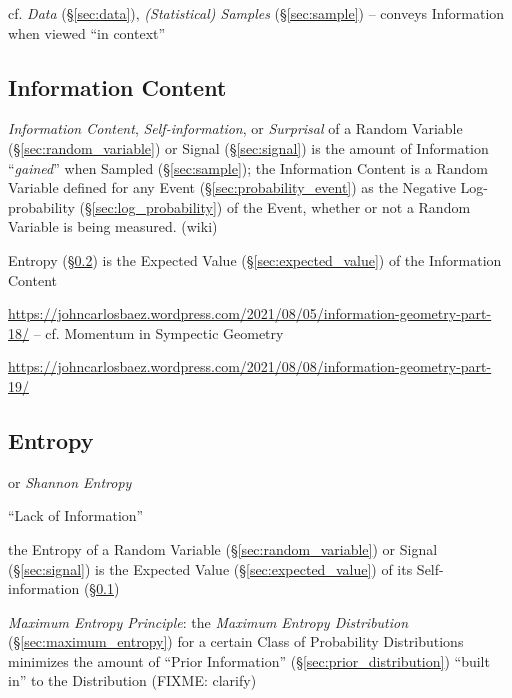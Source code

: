 \fist cf. \emph{Data} (\S\ref{sec:data}), \emph{(Statistical) Samples}
(\S\ref{sec:sample}) -- conveys Information when viewed ``in context''



\subsection{Information Content}\label{sec:information_content}

\emph{Information Content}, \emph{Self-information}, or \emph{Surprisal} of a
Random Variable (\S\ref{sec:random_variable}) or Signal (\S\ref{sec:signal}) is
the amount of Information ``\emph{gained}'' when Sampled (\S\ref{sec:sample});
the Information Content is a Random Variable defined for any Event
(\S\ref{sec:probability_event}) as the Negative Log-probability
(\S\ref{sec:log_probability}) of the Event, whether or not a Random Variable is
being measured. (wiki)

Entropy (\S\ref{sec:entropy}) is the Expected Value
(\S\ref{sec:expected_value}) of the Information Content

\url{https://johncarlosbaez.wordpress.com/2021/08/05/information-geometry-part-18/}
-- cf. Momentum in Sympectic Geometry

\url{https://johncarlosbaez.wordpress.com/2021/08/08/information-geometry-part-19/}



\subsection{Entropy}\label{sec:entropy}

or \emph{Shannon Entropy}

``Lack of Information''

the Entropy of a Random Variable (\S\ref{sec:random_variable}) or Signal
(\S\ref{sec:signal}) is the Expected Value (\S\ref{sec:expected_value}) of its
Self-information (\S\ref{sec:information_content})

\emph{Maximum Entropy Principle}: the \emph{Maximum Entropy Distribution}
(\S\ref{sec:maximum_entropy}) for a certain Class of Probability Distributions
minimizes the amount of ``Prior Information'' (\S\ref{sec:prior_distribution})
``built in'' to the Distribution
(FIXME: clarify)

